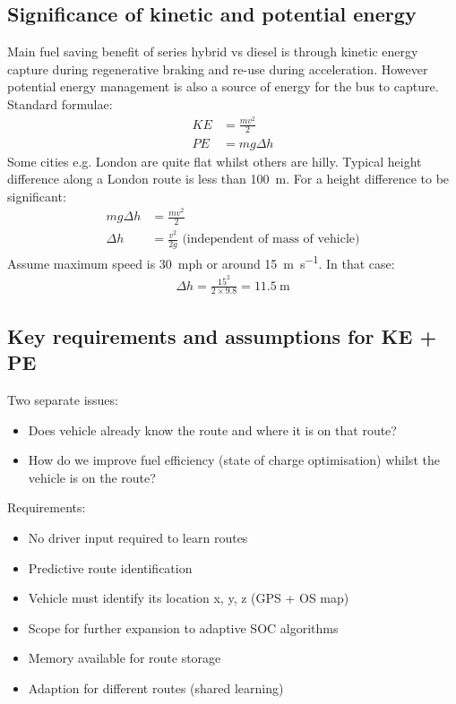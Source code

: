 \subsection{Significance of kinetic and potential energy}
Main fuel saving benefit of series hybrid vs diesel is through kinetic energy capture during regenerative braking and re-use during acceleration. However potential energy management is also a source of energy for the bus to capture. Standard formulae:
\begin{align}
    KE & = \frac{mv^2}{2} \\
    PE & = mg\Delta h
\end{align}
Some cities e.g. London are quite flat whilst others are hilly. Typical height difference along a London route is less than \SI{100}{\meter}. For a height difference to be significant:
\begin{align}
    mg\Delta h & = \frac{mv^2}{2}                                            \\
    \Delta h   & = \frac{v^2}{2g} \textrm{ (independent of mass of vehicle)}
\end{align}
Assume maximum speed is \SI{30}{mph} or around \SI{15}{\meter\per\second}. In that case:
\begin{gather}
    \Delta h = \frac{15^2}{2\times 9.8} = \SI{11.5}{\meter}
\end{gather}
\subsection{Key requirements and assumptions for KE + PE}
Two separate issues:
\begin{itemize}
    \item Does vehicle already know the route and where it is on that route?
    \item How do we improve fuel efficiency (state of charge optimisation) whilst the vehicle is on the route?
\end{itemize}
Requirements:
\begin{itemize}
    \item No driver input required to learn routes
    \item Predictive route identification
    \item Vehicle must identify its location x, y, z (GPS + OS map)
    \item Scope for further expansion to adaptive SOC algorithms
    \item Memory available for route storage
    \item Adaption for different routes (shared learning)
\end{itemize}
